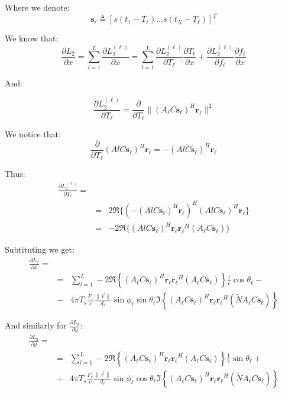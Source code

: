 \documentclass[10pt,a4paper]{report}
\begin{document}
Where we denote:
\begin{equation}
\mathbf{s_\ell} \triangleq [s(t_1-T_\ell) \dots s(t_N-T_\ell)]^T                                                           
\end{equation}

We know that:
\begin{equation}
\frac{\partial L_2}{\partial x} = \sum_{l=1}^L \frac{\partial L_2^{(\ell)}}{\partial x}=\sum_{l=1}^L \frac{\partial L_2^{(\ell)}}{\partial T_\ell}\frac{\partial T_\ell}{\partial x}+\frac{\partial L_2^{(\ell)}}{\partial f_\ell}\frac{\partial f_\ell}{\partial x}
\end{equation}

And:

\begin{equation}
\frac{\partial L_2^{(\ell)}}{\partial T_\ell} = \frac{\partial}{\partial T_\ell} \|(A_\ell C \mathbf{s_\ell})^H\mathbf{r_\ell}\|^2
\end{equation}

We notice that:
\begin{equation}
\frac{\partial}{\partial T_\ell} (Al C \mathbf{s_\ell})^H \mathbf{r_\ell} = - (Al C \mathbf{\dot{s_\ell}})^H \mathbf{r_\ell}
\end{equation}

Thus:
\begin{eqnarray}
\frac{\partial L_2^{(\ell)}}{\partial T_\ell} = \\
&=& 2 \Re \{(- (Al C \mathbf{\dot{s_\ell}})^H \mathbf{r_\ell})^H (Al C \mathbf{s_\ell})^H \mathbf{r_\ell} \} \nonumber\\
&=& -2 \Re \{(Al C \mathbf{s_\ell})^H \mathbf{r_\ell} \mathbf{r_\ell}^H (A_\ell C \mathbf{\dot{s_\ell}})\} \nonumber
\end{eqnarray}

Subtituting we get:
\begin{eqnarray}
\frac{\partial L_2}{\partial x} = \\
&=& \sum_{l=1}^L -2 \Re \left\{ (A_\ell C \mathbf{s_\ell})^H \mathbf{r_\ell} \mathbf{r_\ell}^H (A_\ell C \mathbf{\dot{s_\ell}})\right\}\frac{1}{c}\cos\theta_\ell - \nonumber \\
&-& 4\pi T_s \frac{F_c}{c} \frac{\|\vec{v}\|}{d_\ell} \sin \phi_\ell \sin \theta_\ell \Im \left\{ (A_\ell C  \mathbf{s_\ell})^H \mathbf{r_\ell} \mathbf{r_\ell}^H (\tilde{N} A_\ell C \mathbf{s_\ell})\right\} \nonumber
\end{eqnarray}

And similarly for $\frac{\partial L_2}{\partial y}$:
\begin{eqnarray}
\frac{\partial L_2}{\partial y} = \\
&=& \sum_{l=1}^L -2 \Re \left\{ (A_\ell C \mathbf{s_\ell})^H \mathbf{r_\ell} \mathbf{r_\ell}^H (A_\ell C \mathbf{\dot{s_\ell}})\right\}\frac{1}{c}\sin\theta_\ell + \nonumber \\
&+& 4\pi T_s \frac{F_c}{c} \frac{\|\vec{v}\|}{d_\ell} \sin \phi_\ell \cos \theta_\ell \Im \left\{ (A_\ell C  \mathbf{s_\ell})^H \mathbf{r_\ell} \mathbf{r_\ell}^H (\tilde{N} A_\ell C \mathbf{s_\ell})\right\} \nonumber
\end{eqnarray}
\end{document}
